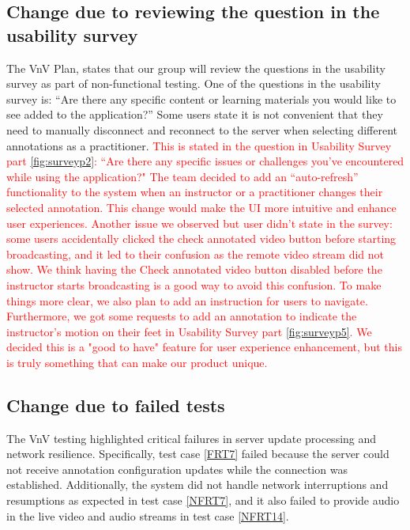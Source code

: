 \documentclass[12pt, titlepage]{article}
\newcommand{\rt}[1]{\textcolor{red}{#1}}
\begin{document}
\subsection{Change due to reviewing the question in the usability survey}

The VnV Plan, states that our group will review the questions in the usability
survey as part of non-functional testing. One of the questions in the usability
survey is: “Are there any specific content or learning materials you would like
to see added to the application?” Some users state it is not convenient that
they need to manually disconnect and reconnect to the server when selecting
different annotations as a practitioner. \rt{This is stated in the question in Usability 
Survey part \ref{fig:surveyp2}: ``Are there any specific issues or challenges you've 
encountered while using the application?" The team decided to add an “auto-refresh” 
functionality to the system when an instructor or a practitioner changes their 
selected annotation. This change would make the UI more intuitive and enhance
user experiences. Another issue we observed but user didn't state in the survey: some 
users accidentally clicked the check annotated video button before starting broadcasting, 
and it led to their confusion as the remote video stream did not show. We think having 
the Check annotated video button disabled before the instructor starts broadcasting is 
a good way to avoid this confusion. To make things more clear, we also plan to add an 
instruction for users to navigate. Furthermore, we got some requests to add an annotation 
to indicate the instructor's motion on their feet in Usability Survey part \ref{fig:surveyp5}. 
We decided this is a "good to have" feature for user experience enhancement, but this 
is truly something that can make our product unique. }

\subsection{Change due to failed tests}

The VnV testing highlighted critical failures in server update processing and
network resilience. Specifically, test case \ref{FRT7} failed because the server
could not receive annotation configuration updates while the connection was
established. Additionally, the system did not handle network interruptions and
resumptions as expected in test case \ref{NFRT7}, and it also failed to provide
audio in the live video and audio streams in test case \ref{NFRT14}.
\end{document}
